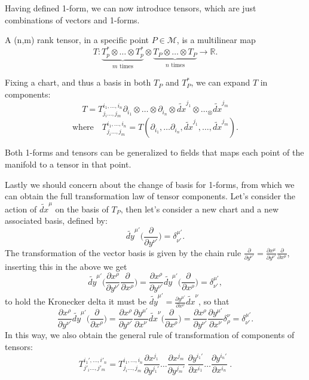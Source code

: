 Having defined 1-form, we can now introduce tensors, which are just combinations of vectors and 1-forms.
\begin{defin}[Tensors]
	A (n,m) rank tensor, in a specific point $P\in\mathcal{M}$, is a multilinear map $$T: \underbrace{T_p^*\otimes\dots\otimes  T_p^*}_\text{$m$ times}\otimes \underbrace{T_P\otimes \dots \otimes T_P}_\text{$n$ times}\longrightarrow \mathbb{R} .$$
\end{defin}
Fixing a chart, and thus a basis in both $T_P$ and $T_P^*$, we can expand $T$ in components:
$$\boxed{T=T^{i_1,\dots,i_n}_{j_i\dots,j_m}\partial_{i_1}\otimes\dots\otimes\partial_{i_n}\otimes\tilde{dx}^{j_1}\otimes\dots_\otimes\tilde{dx}^{j_m}}$$$$ \text{where}\quad T^{i_1,\dots,i_n}_{j_i\dots,j_m}=T(\partial_{i_1},\dots\partial_{i_n},\tilde{dx}^{j_1},\dots,\tilde{dx}^{j_m}).$$

Both 1-forms and tensors can be generalized to fields that maps each point of the manifold to a tensor in that point.

Lastly we should concern about the change of basis for 1-forms, from which we can obtain the full transformation law of tensor components. Let's consider the action of $\tilde{dx}^\mu$ on the basis of $T_P$, then let's consider a new chart and a new associated basis, defined by: $$\tilde{dy}^{\mu'}\bigg(\frac{\partial}{\partial y^{\nu'}}\bigg)=\delta^{\mu'}_{\nu'}.$$
The transformation of the vector basis is given by the chain rule $\frac{\partial}{\partial y^{\nu'}}=\frac{\partial x^\mu}{\partial y^{\nu'}}\frac{\partial}{\partial x^{\mu}}$, inserting this in the above we get $$\tilde{dy}^{\mu'}\bigg(\frac{\partial x^\rho}{\partial y^{\nu'}}\frac{\partial}{\partial x^{\rho}}\bigg)=\frac{\partial x^\rho}{\partial y^{\nu'}}\tilde{dy}^{\mu'}\bigg(\frac{\partial}{\partial x^{\rho}}\bigg)=\delta^{\mu'}_{\nu'},$$
to hold the Kronecker delta it must be $\tilde{dy}^{\mu'}=\frac{\partial y^{\mu'}}{\partial x^{\nu}}\tilde{dx}^{\nu}$, so that$$\frac{\partial x^\rho}{\partial y^{\nu'}}\tilde{dy}^{\mu'}\bigg(\frac{\partial}{\partial x^{\rho}}\bigg)=\frac{\partial x^\rho}{\partial y^{\nu'}}\frac{\partial y^{\mu'}}{\partial x^{\nu}}\tilde{dx}^{\nu}\bigg(\frac{\partial}{\partial x^{\rho}}\bigg)=\frac{\partial x^\rho}{\partial y^{\nu'}}\frac{\partial y^{\mu'}}{\partial x^{\nu}}\delta^\nu_\rho=\delta^{\mu'}_{\nu'}.$$
In this way, we also obtain the general rule of transformation of components of tensors:
$$\boxed{T^{i_1',\dots,i'_n}_{j'_i\dots,j'_m}=T^{i_1,\dots,i_n}_{j_i\dots,j_m}\frac{\partial x^{j_1}}{\partial y^{j_1'}}\dots\frac{\partial x^{j_m}}{\partial y^{j_m'}}\ \frac{\partial y^{i_1'}}{\partial x^{i_1}}\dots\frac{\partial y^{i_n'}}{\partial x^{i_n}}}\ .$$